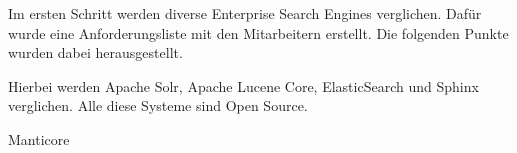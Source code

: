 Im ersten Schritt werden diverse Enterprise Search Engines verglichen. Dafür wurde eine Anforderungsliste mit den Mitarbeitern erstellt. Die folgenden Punkte wurden dabei herausgestellt.

Hierbei werden Apache Solr, Apache Lucene Core, ElasticSearch und Sphinx verglichen. Alle diese Systeme sind Open Source. 

Manticore